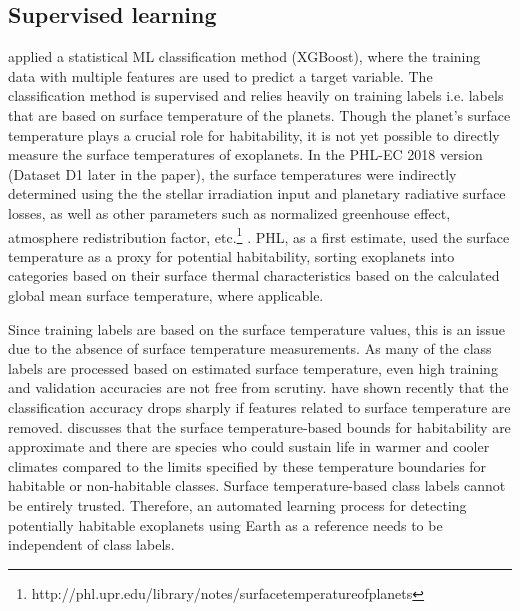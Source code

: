 \documentclass[fleqn,usenatbib]{mnras}
\begin{document}
\subsection{Supervised learning}
\label{sec:2.2}

\citet{new} applied a statistical ML classification method (XGBoost), where the training data with multiple features are used to predict a target variable. The classification method is supervised and relies heavily on training labels i.e. labels that are based on surface temperature of the planets. Though the planet's surface temperature plays a crucial role for habitability, it is not yet possible to directly measure the  surface temperatures of exoplanets. In the PHL-EC 2018  version (Dataset D1 later in the paper), the surface temperatures were indirectly determined using the the stellar irradiation input and planetary radiative surface losses, as well as other parameters such as normalized greenhouse effect, atmosphere redistribution factor,  etc.\footnote{\!\!http://phl.upr.edu/library/notes/surfacetemperatureofplanets} \citep{surfacetemp}. PHL, as a first estimate, used the surface temperature as a proxy for potential habitability, sorting exoplanets into categories based on their surface thermal characteristics  based on the calculated global mean surface temperature, where applicable.

Since training labels are based on the surface temperature values, this is an issue due to the absence of surface temperature measurements. As many of the class labels are processed based on estimated surface temperature, even high training and validation accuracies are not free from scrutiny. \citet{saha2019evolution} have shown recently that the classification accuracy drops sharply if features related to surface temperature are removed. \citet{mendez} discusses that the surface temperature-based bounds for habitability are approximate and there are species who could sustain life in warmer and cooler climates compared to the limits specified by these temperature boundaries for habitable or non-habitable classes. Surface temperature-based class labels cannot be entirely trusted. Therefore, an automated learning process for detecting potentially habitable exoplanets using Earth as a reference needs to be independent of class labels.
\end{document}
